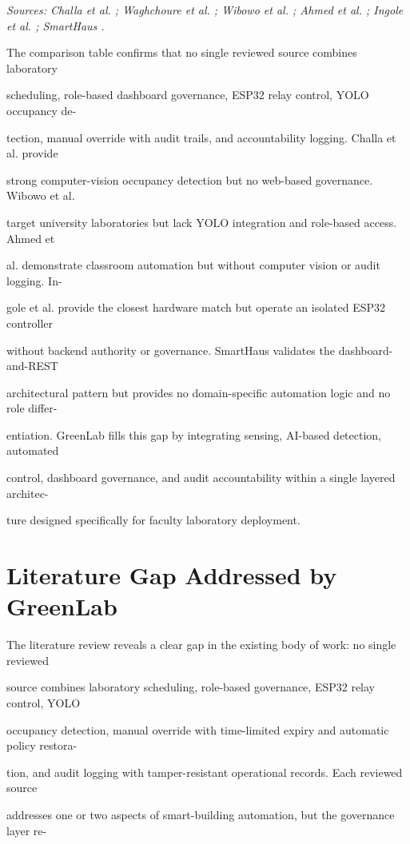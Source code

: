 	{\small \textit{Sources: Challa et al. \cite{challa2025}; Waghchoure et al. \cite{waghchoure2025}; Wibowo et al. \cite{wibowo2023}; Ahmed et al. \cite{ahmed2020}; Ingole et al. \cite{ingole2024}; SmartHaus \cite{smarthaus}.}}


The comparison table conﬁrms that no single reviewed source combines laboratory

scheduling, role-based dashboard governance, ESP32 relay control, YOLO occupancy de-

tection, manual override with audit trails, and accountability logging. Challa et al. provide

strong computer-vision occupancy detection but no web-based governance. Wibowo et al.

target university laboratories but lack YOLO integration and role-based access. Ahmed et

al. demonstrate classroom automation but without computer vision or audit logging. In-

gole et al. provide the closest hardware match but operate an isolated ESP32 controller

without backend authority or governance. SmartHaus validates the dashboard-and-REST

architectural pattern but provides no domain-speciﬁc automation logic and no role differ-

entiation. GreenLab ﬁlls this gap by integrating sensing, AI-based detection, automated

control, dashboard governance, and audit accountability within a single layered architec-

ture designed speciﬁcally for faculty laboratory deployment.


\section{Literature Gap Addressed by GreenLab}
The literature review reveals a clear gap in the existing body of work: no single reviewed

source combines laboratory scheduling, role-based governance, ESP32 relay control, YOLO

occupancy detection, manual override with time-limited expiry and automatic policy restora-

tion, and audit logging with tamper-resistant operational records. Each reviewed source

addresses one or two aspects of smart-building automation, but the governance layer re-

